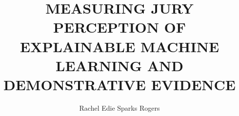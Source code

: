 \documentclass[print]{nuthesis}
\begin{document}
\frontmatter
\title{MEASURING JURY PERCEPTION OF EXPLAINABLE MACHINE LEARNING AND DEMONSTRATIVE EVIDENCE}
\author{Rachel Edie Sparks Rogers}
\maketitle
\end{document}

